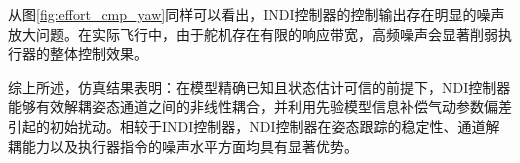 从图\ref{fig:effort_cmp_yaw}同样可以看出，INDI控制器的控制输出存在明显的噪声放大问题。在实际飞行中，由于舵机存在有限的响应带宽，高频噪声会显著削弱执行器的整体控制效果。

综上所述，仿真结果表明：在模型精确已知且状态估计可信的前提下，NDI控制器能够有效解耦姿态通道之间的非线性耦合，并利用先验模型信息补偿气动参数偏差引起的初始扰动。相较于INDI控制器，NDI控制器在姿态跟踪的稳定性、通道解耦能力以及执行器指令的噪声水平方面均具有显著优势。







